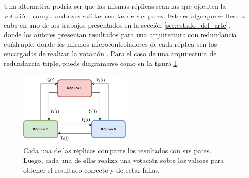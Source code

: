 
Una alternativa podría ser que las mismas réplicas sean las que ejecuten la votación, comparando sus salidas con las de sus pares. Esto es algo que se lleva a cabo en uno de los trabajos presentados en la sección \ref{sec:estado_del_arte}, donde los autores presentan resultados para una arquitectura con redundancia cuádruple, donde los mismos microcontroladores de cada réplica son los encargados de realizar la votación \cite{hiergeist2018implementation}.
Para el caso de una arquitectura de redundancia triple, puede diagramarse como en la figura \ref{fig:TMR_sin_arbitro}.


\begin{figure}[htb]
    \centering
    \includegraphics[width=0.5\textwidth]{img/TMR_sin_arbitro.png}
    \caption{Cada una de las réplicas comparte los resultados con sus pares. Luego, cada una de ellas realiza una votación sobre los valores para obtener el resultado correcto y detectar fallas.}
    \label{fig:TMR_sin_arbitro}
\end{figure}

